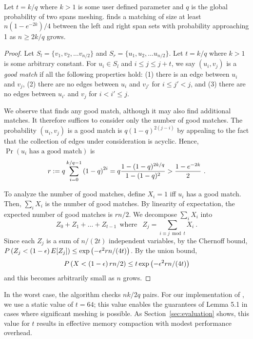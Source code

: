 \begin{lemma}
Let $t=k/q$ where $k>1$ is some user defined parameter and $q$ is the global probability of two
spans meshing. \sm finds a matching
of size at least $n(1-e^{-2k})/4$ between the left and right span sets
with probability approaching 1 as $n\geq 2k/q$ grows.
\end{lemma}

\begin{proof}
Let $S_l=\{v_1, v_2, \ldots v_{n/2}\}$ and $S_r=\{u_1,
u_2, \ldots u_{n/2}\}$. Let $t=k/q$ where
$k>1$ is some arbitrary constant. For $u_i\in S_l$ and $i \leq j \leq
j+t$, we say $(u_i,v_j)$ is a \emph{good match} if all the following
properties hold: (1) there is an edge between $u_i$ and $v_j$, (2)
there are no edges between $u_i$ and $v_{j'}$ for $i\leq j'<j$, and
(3) there are no edges between $u_{i'}$ and $v_{j}$ for $i< i'\leq j$.

We observe that \sm finds any good match, although it may
also find additional matches. It therefore suffices to consider only
the number of good matches. The probability $(u_i,v_j)$ is a good
match is $q(1-q)^{2(j-i)}$ by appealing to the fact that the collection of edges under consideration is acyclic. Hence, $\Pr(u_i \mbox{ has a good match})$
is
\begin{align*}
r:= q \sum_{i=0}^{k/q-1} \left( 1-q\right) ^{2i} = q \frac{1-(1-q)^{2k/q}}{1-(1-q)^2}
 > \frac{1-e^{-2k}}{2} \ .
\end{align*}

To analyze the number of good matches, define $X_i = 1$ iff $u_i$ has
a good match. Then, $\sum_i X_i$ is the number of good matches. By
linearity of expectation, the expected number of good matches is
$rn/2$. We decompose $\sum_i X_i$ into \[Z_0+Z_1+\ldots + Z_{t-1} ~~\mbox{
  where }~~ Z_{j} = \sum_{i\equiv j \bmod t} X_i \ .\] Since each
$Z_j$ is a sum of $n/(2t)$ independent variables, by the Chernoff
bound, $P\left( Z_j < \left( 1-\epsilon \right) E[Z_j]\right) \leq \exp\left( -
\epsilon^2 r n/(4t)\right)$.  By the union bound,
$$P\left( X < \left( 1-\epsilon \right) rn/2\right) \leq t \exp\left( - \epsilon^2 r
n/(4t)\right)$$ and this becomes arbitrarily small as $n$ grows.
\end{proof}

In the worst case, the algorithm checks $nk/2q$ pairs. For our
implementation of \Mesh, we use a static value of $t = 64$; this value
enables the guarantees of Lemma 5.1 in cases where significant meshing
is possible.  As Section~\ref{sec:evaluation} shows, this value for
$t$ results in effective memory compaction with modest performance
overhead.



